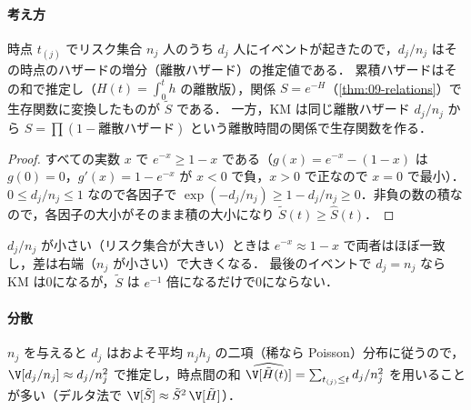 \paragraph{考え方}
時点 $t_{(j)}$ でリスク集合 $n_j$ 人のうち $d_j$ 人にイベントが起きたので，$d_j/n_j$ はその時点のハザードの増分（離散ハザード）の推定値である．
累積ハザードはその和で推定し（$H(t)=\int_0^th$ の離散版），関係 $S=e^{-H}$（\cref{thm:09-relations}）で生存関数に変換したものが $\tilde S$ である．
一方，KM は同じ離散ハザード $d_j/n_j$ から $S=\prod(1-\text{離散ハザード})$ という離散時間の関係で生存関数を作る．
\begin{proof}
すべての実数 $x$ で $e^{-x}\ge1-x$ である（$g(x)=e^{-x}-(1-x)$ は $g(0)=0$，$g'(x)=1-e^{-x}$ が $x<0$ で負，$x>0$ で正なので $x=0$ で最小）．
$0\le d_j/n_j\le1$ なので各因子で $\exp(-d_j/n_j)\ge1-d_j/n_j\ge0$．非負の数の積なので，各因子の大小がそのまま積の大小になり $\tilde S(t)\ge\hat S(t)$．
\end{proof}
$d_j/n_j$ が小さい（リスク集合が大きい）ときは $e^{-x}\approx1-x$ で両者はほぼ一致し，差は右端（$n_j$ が小さい）で大きくなる．
最後のイベントで $d_j=n_j$ なら KM は0になるが，$\tilde S$ は $e^{-1}$ 倍になるだけで0にならない．
\paragraph{分散}
$n_j$ を与えると $d_j$ はおよそ平均 $n_jh_j$ の二項（稀なら Poisson）分布に従うので，$\V[d_j/n_j]\approx d_j/n_j^2$ で推定し，時点間の和
$\widehat\V[\tilde H(t)]=\sum_{t_{(j)}\le t}d_j/n_j^2$ を用いることが多い（デルタ法で $\V[\tilde S]\approx\tilde S^2\,\V[\tilde H]$）．

